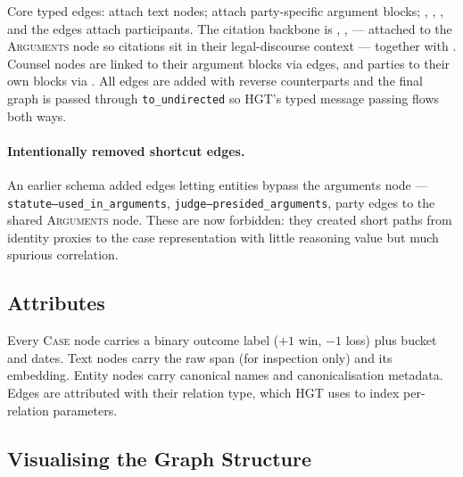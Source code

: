 \begin{sloppypar}
Core typed edges:  attach text nodes;  attach party-specific argument blocks; , , , and the  edges attach participants. The citation backbone is , ,  --- attached to the \textsc{Arguments} node so citations sit in their legal-discourse context --- together with . Counsel nodes are linked to their argument blocks via  edges, and parties to their own blocks via . All edges are added with reverse counterparts and the final graph is passed through \texttt{to\_undirected} so HGT's typed message passing flows both ways.
\end{sloppypar}

\paragraph{Intentionally removed shortcut edges.} An earlier schema added edges letting entities bypass the arguments node --- \texttt{statute--used\_in\_arguments}, \texttt{judge--presided\_arguments}, party edges to the shared \textsc{Arguments} node. These are now forbidden: they created short paths from identity proxies to the case representation with little reasoning value but much spurious correlation.

\subsection{Attributes}

Every \textsc{Case} node carries a binary outcome label ($+1$ win, $-1$ loss) plus bucket and dates. Text nodes carry the raw span (for inspection only) and its embedding. Entity nodes carry canonical names and canonicalisation metadata. Edges are attributed with their relation type, which HGT uses to index per-relation parameters.

\subsection{Visualising the Graph Structure}
\label{sec:graph_visualizations}

